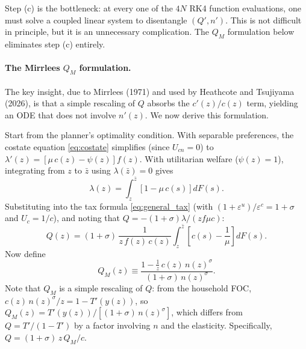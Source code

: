 \documentclass[12pt,a4paper]{article}
\theoremstyle{definition}
\theoremstyle{plain}
\theoremstyle{remark}
\newcommand{\zbar}{\bar{z}}
\begin{document}
Step (c) is the bottleneck: at every one of the $4N$ RK4 function evaluations, one must solve a coupled linear system to disentangle $(Q', n')$. This is not difficult in principle, but it is an unnecessary complication. The $Q_M$ formulation below eliminates step (c) entirely.

\paragraph{The Mirrlees $Q_M$ formulation.} The key insight, due to Mirrlees (1971) and used by Heathcote and Tsujiyama (2026), is that a simple rescaling of $Q$ absorbs the $c'(z)/c(z)$ term, yielding an ODE that does not involve $n'(z)$. We now derive this formulation.

Start from the planner's optimality condition. With separable preferences, the costate equation \eqref{eq:costate} simplifies (since $U_{cn} = 0$) to $\lambda'(z) = [\mu\, c(z) - \psi(z)]f(z)$. With utilitarian welfare ($\psi(z) = 1$), integrating from $z$ to $\zbar$ using $\lambda(\zbar) = 0$ gives
\[
  \lambda(z) = \int_{z}^{\zbar} \left[1 - \mu\, c(s)\right] dF(s).
\]
Substituting into the tax formula \eqref{eq:general_tax} (with $(1+\varepsilon^u)/\varepsilon^c = 1+\sigma$ and $U_c = 1/c$), and noting that $Q = -(1+\sigma)\lambda/(z f \mu c)$:
\begin{equation}
  Q(z) = (1+\sigma)\,\frac{1}{z\,f(z)\,c(z)} \int_{z}^{\zbar} \left[c(s) - \frac{1}{\mu}\right] dF(s).
  \label{eq:Q_integral}
\end{equation}
Now define
\begin{equation}
  Q_M(z) \equiv \frac{1 - \frac{1}{z}\,c(z)\,n(z)^{\sigma}}{(1+\sigma)\,n(z)^{\sigma}}.
  \label{eq:QM_def}
\end{equation}
Note that $Q_M$ is a simple rescaling of $Q$: from the household FOC, $c(z)\,n(z)^{\sigma}/z = 1 - T'(y(z))$, so $Q_M(z) = T'(y(z))/[(1+\sigma)\,n(z)^{\sigma}]$, which differs from $Q = T'/(1-T')$ by a factor involving $n$ and the elasticity. Specifically, $Q = (1+\sigma)\,z\,Q_M/c$.
\end{document}
